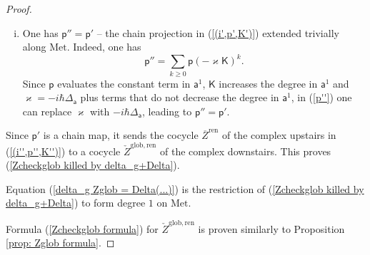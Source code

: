 \documentclass[11pt,a4paper]{amsart}
\theoremstyle{plain} %
\theoremstyle{definition}
\theoremstyle{remark}
\newcommand{\mr}{\mathrm}
\newcommand{\sfa}{\mathsf{a}}
\begin{document}
\begin{proof}
\begin{enumerate}[(i)]
    \item One has $\mathsf{p}''=\mathsf{p'}$ -- the chain projection in (\ref{(i',p',K')}) extended trivially along $\mr{Met}$. Indeed, one has
    \begin{equation}\label{p''}
    \mathsf{p}''=\sum_{k\geq 0}\mathsf{p} (-\varkappa \mathsf{K})^k.
    \end{equation}
    Since $\mathsf{p}$ evaluates the constant term in $\sfa^1$, $\mathsf{K}$ increases the degree in $\sfa^1$ and $\varkappa=-i\hbar\Delta_\sfa$ plus terms that do not decrease the degree in $\sfa^1$, in (\ref{p''}) one can replace $\varkappa$ with $-i\hbar\Delta_\sfa$, leading to $\mathsf{p}''=\mathsf{p}'$.
\end{enumerate}

Since $\mathsf{p}'$ is a chain map, it sends the cocycle $\overline{Z}^\mr{ren}$ of the complex upstairs in (\ref{(i'',p'',K'')}) to a cocycle $\check{Z}^\mr{glob,ren}$ of the complex downstairs. This proves (\ref{Zcheckglob killed by delta_g+Delta}).

Equation (\ref{delta_g Zglob = Delta(...)}) is the restriction of (\ref{Zcheckglob killed by delta_g+Delta}) to form degree $1$ on $\mr{Met}$.

Formula (\ref{Zcheckglob formula}) for $\check{Z}^\mr{glob,ren}$ is proven similarly to Proposition \ref{prop: Zglob formula}.
\end{proof}
\end{document}
